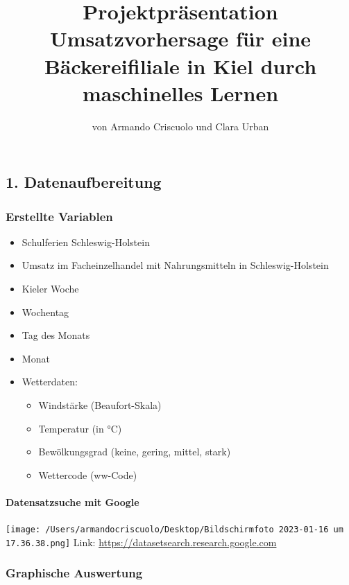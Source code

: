 \documentclass[
]{article}
\title{ Projektpräsentation Umsatzvorhersage für eine Bäckereifiliale in
Kiel durch maschinelles Lernen}
\author{ von Armando Criscuolo und Clara Urban}
\date{}
\providecommand{\tightlist}{%
  \setlength{\itemsep}{0pt}\setlength{\parskip}{0pt}}
\begin{document}
\maketitle

\hypertarget{datenaufbereitung}{%
\subsection{1. Datenaufbereitung}\label{datenaufbereitung}}

\hypertarget{erstellte-variablen}{%
\subsubsection{Erstellte Variablen}\label{erstellte-variablen}}

\begin{itemize}
\tightlist
\item
  Schulferien Schleswig-Holstein
\item
  Umsatz im Facheinzelhandel mit Nahrungsmitteln in Schleswig-Holstein
\item
  Kieler Woche
\item
  Wochentag
\item
  Tag des Monats
\item
  Monat
\item
  Wetterdaten:

  \begin{itemize}
  \tightlist
  \item
    Windstärke (Beaufort-Skala)
  \item
    Temperatur (in °C)
  \item
    Bewölkungsgrad (keine, gering, mittel, stark)
  \item
    Wettercode (ww-Code)
  \end{itemize}
\end{itemize}

\hypertarget{datensatzsuche-mit-google}{%
\paragraph{Datensatzsuche mit Google}\label{datensatzsuche-mit-google}}

\texttt{[image: /Users/armandocriscuolo/Desktop/Bildschirm­foto 2023-01-16 um 17.36.38.png]}
Link: \url{https://datasetsearch.research.google.com}

\hypertarget{graphische-auswertung}{%
\subsubsection{Graphische Auswertung}\label{graphische-auswertung}}
\end{document}
